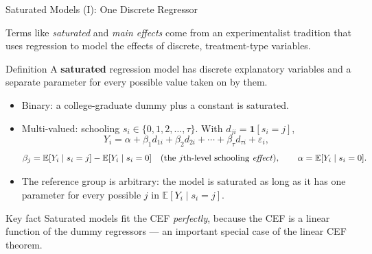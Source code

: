 \documentclass[aspectratio=169,11pt]{beamer}
\newcommand{\E}{\mathbb{E}}
\begin{document}
\begin{frame}{Saturated Models (I): One Discrete Regressor}
\small

Terms like \emph{saturated} and \emph{main effects} come from an
experimentalist tradition that uses regression to model the effects of
discrete, treatment-type variables.

\begin{block}{Definition}
A \textbf{saturated} regression model has discrete explanatory variables and
a separate parameter for every possible value taken on by them.
\end{block}

\begin{itemize}
    \item Binary: a college-graduate dummy plus a constant is saturated.
    \item Multi-valued: schooling $s_i\in\{0,1,2,\ldots,\tau\}$. With
    $d_{ji}=\mathbf{1}[s_i=j]$,
    \[
    Y_i = \alpha + \beta_1d_{1i}+\beta_2d_{2i}+\cdots+\beta_\tau d_{\tau i}+\varepsilon_i,
    \]
    \[
    \beta_j = \E[Y_i\mid s_i=j]-\E[Y_i\mid s_i=0]
    \quad\text{(the $j$th-level schooling \emph{effect})},
    \qquad
    \alpha = \E[Y_i\mid s_i=0].
    \]
    \item The reference group is arbitrary: the model is saturated as long as
    it has one parameter for every possible $j$ in $\E[Y_i\mid s_i=j]$.
\end{itemize}

\begin{alertblock}{Key fact}
Saturated models fit the CEF \emph{perfectly}, because the CEF is a linear
function of the dummy regressors --- an important special case of the
linear CEF theorem.
\end{alertblock}

\end{frame}
\end{document}
